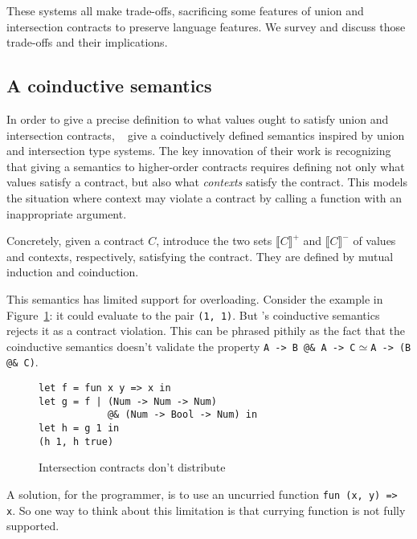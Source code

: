 \documentclass[sigplan,screen,10pt]{acmart}
\newcommand{\nickel}[1]{\lstinline[language=nickel]{#1}}
\begin{document}
These systems all make trade-offs, sacrificing some features of union
and intersection contracts to preserve language features. We survey
and discuss those trade-offs and their implications.

\subsection{A coinductive semantics}
\label{sec:coinductive-sem}

In order to give a precise definition to what values ought to satisfy
union and intersection contracts,
\citeauthor{KeilThiemannUnionIntersection}~\cite{KeilThiemannUnionIntersection}
give a coinductively defined semantics inspired by union and
intersection type systems.
The key innovation of their work is recognizing that giving a
semantics to higher-order contracts requires defining not only what
values satisfy a contract, but also what \emph{contexts} satisfy the
contract. This models the situation where context may violate a
contract by calling a function with an inappropriate argument.

Concretely, given a contract $C$, \citeauthor{KeilThiemannUnionIntersection}
introduce the two sets $\llbracket C \rrbracket^+$ and $\llbracket C
\rrbracket^-$ of values and contexts, respectively, satisfying the contract.
They are defined by mutual induction and coinduction.

This semantics has limited support for overloading. Consider the example in
Figure~\ref{fig:intersection-distribution}: it could evaluate to the pair
\nickel{(1, 1)}. But \citeauthor{KeilThiemannUnionIntersection}'s coinductive
semantics rejects it as a contract violation.  This can be phrased pithily as
the fact that the coinductive semantics doesn't validate the property
\nickel{A -> B @& A -> C}$\simeq$\nickel{A -> (B @& C)}.

\begin{figure}[h]
\begin{lstlisting}[language=nickel]
let f = fun x y => x in
let g = f | (Num -> Num -> Num)
            @& (Num -> Bool -> Num) in
let h = g 1 in
(h 1, h true)
\end{lstlisting}
\caption{Intersection contracts don't distribute}
\label{fig:intersection-distribution}
\end{figure}

A solution, for the programmer, is to use an uncurried function
\nickel{fun (x, y) => x}. So one way to think about this limitation is
that currying function is not fully supported.
\end{document}
